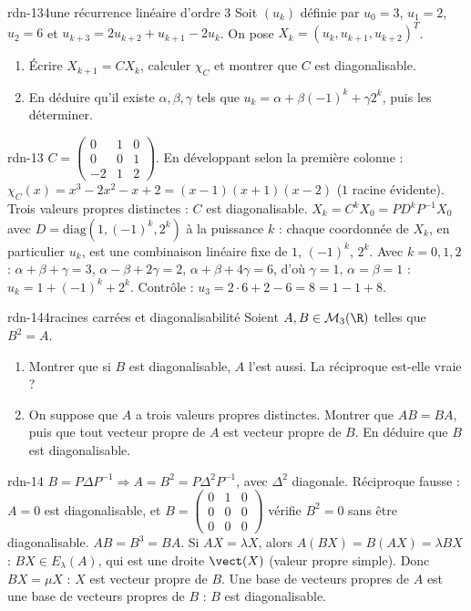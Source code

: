 \begin{exo}{rdn-13}{4}{une récurrence linéaire d'ordre 3}
Soit $(u_k)$ définie par $u_0=3$, $u_1=2$, $u_2=6$ et $u_{k+3}=2u_{k+2}+u_{k+1}-2u_k$. On pose $X_k=(u_k,u_{k+1},u_{k+2})^T$.
\begin{enumerate}
\item Écrire $X_{k+1}=CX_k$, calculer $\chi_C$ et montrer que $C$ est diagonalisable.
\item En déduire qu'il existe $\alpha,\beta,\gamma$ tels que $u_k=\alpha+\beta(-1)^k+\gamma2^k$, puis les déterminer.
\end{enumerate}
\end{exo}
\begin{corrige}{rdn-13}
 $C=\begin{pmatrix}0&1&0\\0&0&1\\-2&1&2\end{pmatrix}$. En développant selon la première colonne :
$\chi_C(x)=x^3-2x^2-x+2=(x-1)(x+1)(x-2)$ ($1$ racine évidente). Trois valeurs propres distinctes : $C$ est diagonalisable.
 $X_k=C^kX_0=PD^kP^{-1}X_0$ avec $D=\mathrm{diag}(1,(-1)^k,2^k)$ à la puissance $k$ : chaque coordonnée de $X_k$, en particulier
$u_k$, est une combinaison linéaire fixe de $1$, $(-1)^k$, $2^k$. Avec $k=0,1,2$ : $\alpha+\beta+\gamma=3$, $\alpha-\beta+2\gamma=2$,
$\alpha+\beta+4\gamma=6$, d'où $\gamma=1$, $\alpha=\beta=1$ : $u_k=1+(-1)^k+2^k$. Contrôle : $u_3=2\cdot6+2-6=8=1-1+8$.
\end{corrige}

\begin{exo}{rdn-14}{4}{racines carrées et diagonalisabilité}
Soient $A,B\in\mathcal M_3(\R)$ telles que $B^2=A$.
\begin{enumerate}
\item Montrer que si $B$ est diagonalisable, $A$ l'est aussi. La réciproque est-elle vraie ?
\item On suppose que $A$ a trois valeurs propres distinctes. Montrer que $AB=BA$, puis que tout vecteur propre de $A$ est vecteur
propre de $B$. En déduire que $B$ est diagonalisable.
\end{enumerate}
\end{exo}
\begin{corrige}{rdn-14}
 $B=P\Delta P^{-1}\Rightarrow A=B^2=P\Delta^2P^{-1}$, avec $\Delta^2$ diagonale. Réciproque fausse : $A=0$ est diagonalisable, et
$B=\begin{pmatrix}0&1&0\\0&0&0\\0&0&0\end{pmatrix}$ vérifie $B^2=0$ sans être diagonalisable.
 $AB=B^3=BA$. Si $AX=\lambda X$, alors $A(BX)=B(AX)=\lambda BX$ : $BX\in E_\lambda(A)$, qui est une droite $\vect(X)$ (valeur
propre simple). Donc $BX=\mu X$ : $X$ est vecteur propre de $B$. Une base de vecteurs propres de $A$ est une base de vecteurs
propres de $B$ : $B$ est diagonalisable.
\end{corrige}
